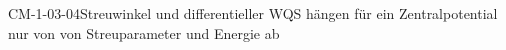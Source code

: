 
\begin{CONC}{CM-1-03-04}{Streuwinkel und differentieller WQS hängen für ein Zentralpotential nur von von Streuparameter und Energie ab}
\end{CONC}
